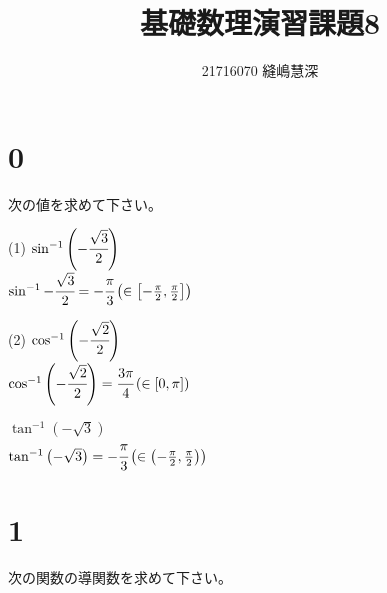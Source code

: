 \documentclass[fleqn]{jsarticle}
\title{基礎数理演習課題8}
\author{21716070 縫嶋慧深}
\begin{document}
	\maketitle

    \section*{0}
    次の値を求めて下さい。

    \begin{description}
        \setlength{\itemsep}{0.5cm}

        \begin{multicols}{2}

            \item[(1)]
                $ \sin^{-1}{\left(-\cfrac{\sqrt{3}}{2}\right)} $ \\
                $ \sin^{-1}{-\cfrac{\sqrt{3}}{2}} = -\cfrac{\pi}{3}\left(\in\left[-\frac{\pi}{2}, \frac{\pi}{2}\right]\right) $

            \item[(2)]
                $ \cos^{-1}{\left(-\cfrac{\sqrt{2}}{2}\right)} $ \\
                $ \cos^{-1}{\left(-\cfrac{\sqrt{2}}{2}\right)} = \cfrac{3\pi}{4}\left(\in\left[0, \pi\right]\right) $

        \end{multicols}

        \item[(5)]
            $ \tan^{-1}{\left(-\sqrt{3}\right)} $ \\
            $ \tan^{-1}{\left(-\sqrt{3}\right)} = -\cfrac{\pi}{3}\left(\in\left(-\frac{\pi}{2}, \frac{\pi}{2}\right)\right) $

    \end{description}


    \section*{1}
    次の関数の導関数を求めて下さい。
\end{document}

